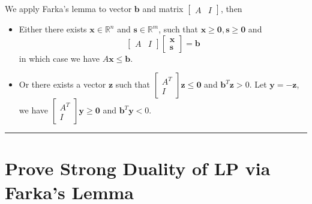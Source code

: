 \documentclass{article}
\newcommand{\bs}{\boldsymbol}
\newenvironment{proof}{{\bf Proof:}}{\hfill\rule{2mm}{2mm}}
\begin{document}
\begin{proof}
We apply Farka's lemma to vector $\bs{b}$ and matrix $\begin{bmatrix} A & I\end{bmatrix}$, then 
\begin{itemize}
	\item Either there exists $\bs{x} \in \mathbb{R}^n$ and $\bs{s} \in \mathbb{R}^m$, such that $\bs{x} \ge \bs{0}, \bs{s} \ge \bs{0}$ and 
	\[ \begin{bmatrix} A & I\end{bmatrix} \begin{bmatrix} \bs{x} \\ \bs{s}\end{bmatrix} = \bs{b} \]
	in which case we have $A\bs{x} \le \bs{b}$.
	\item Or there exists a vector $\bs{z}$ such that $\begin{bmatrix} A^T \\ I\end{bmatrix} \bs{z} \le \bs{0}$ and $\bs{b}^T\bs{z} > 0$. Let $\bs{y} = -\bs{z}$, we have $\begin{bmatrix} A^T \\ I\end{bmatrix} \bs{y} \ge \bs{0}$ and $\bs{b}^T\bs{y} < 0$.
\end{itemize}
\end{proof}

\section{Prove Strong Duality of LP via Farka's Lemma}
\end{document}
